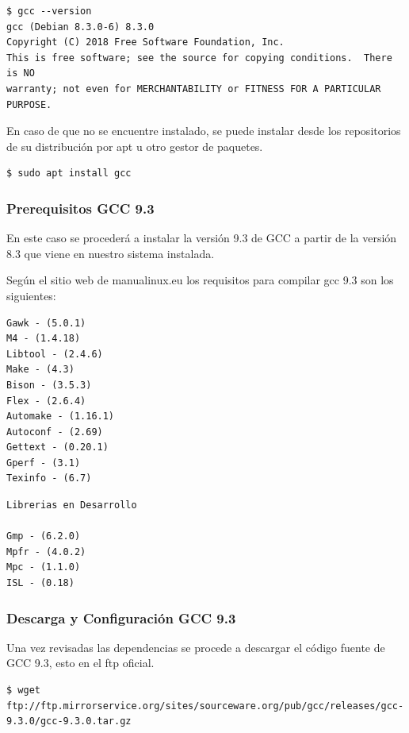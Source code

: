 \documentclass[12pt]{article}
\begin{document}
\begin{lstlisting}[frame=single,framexrightmargin=15pt]
$ gcc --version
gcc (Debian 8.3.0-6) 8.3.0
Copyright (C) 2018 Free Software Foundation, Inc.
This is free software; see the source for copying conditions.  There is NO
warranty; not even for MERCHANTABILITY or FITNESS FOR A PARTICULAR PURPOSE.
\end{lstlisting}

En caso de que no se encuentre instalado, se puede instalar desde los repositorios de su distribución por apt u otro gestor de paquetes.

\begin{lstlisting}[frame=single,framexrightmargin=15pt]
$ sudo apt install gcc
\end{lstlisting}

\subsubsection{Prerequisitos GCC 9.3}

En este caso se procederá a instalar la versión 9.3 de GCC a partir de la versión 8.3 que viene en nuestro sistema instalada.

Según el sitio web de manualinux.eu\cite{mlinux} los requisitos para compilar gcc 9.3 son los siguientes:

\begin{lstlisting}[frame=single,framexrightmargin=15pt]
Gawk - (5.0.1)
M4 - (1.4.18)
Libtool - (2.4.6)
Make - (4.3)
Bison - (3.5.3)
Flex - (2.6.4)
Automake - (1.16.1)
Autoconf - (2.69)
Gettext - (0.20.1)
Gperf - (3.1)
Texinfo - (6.7)
\end{lstlisting}
\bigskip
\bigskip
\begin{lstlisting}[frame=single,framexrightmargin=15pt]
Librerias en Desarrollo

Gmp - (6.2.0)
Mpfr - (4.0.2)
Mpc - (1.1.0)
ISL - (0.18)
\end{lstlisting}

\subsubsection{Descarga y Configuración GCC 9.3}

Una vez revisadas las dependencias se procede a descargar el código fuente de GCC 9.3, esto en el ftp oficial.

\begin{lstlisting}[frame=single,framexrightmargin=15pt]
$ wget ftp://ftp.mirrorservice.org/sites/sourceware.org/pub/gcc/releases/gcc-9.3.0/gcc-9.3.0.tar.gz
\end{lstlisting}
\end{document}
